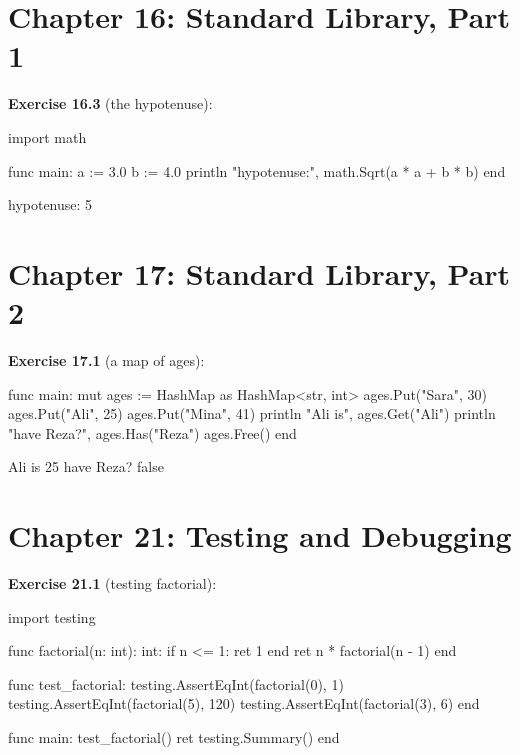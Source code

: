 \section*{Chapter 16: Standard Library, Part 1}

\textbf{Exercise 16.3} (the hypotenuse):

\begin{salamen}
import math

func main:
    a := 3.0
    b := 4.0
    println "hypotenuse:", math.Sqrt(a * a + b * b)
end
\end{salamen}

\begin{progout}
hypotenuse: 5
\end{progout}

\section*{Chapter 17: Standard Library, Part 2}

\textbf{Exercise 17.1} (a map of ages):

\begin{salamen}
func main:
    mut ages := HashMap {} as HashMap<str, int>
    ages.Put("Sara", 30)
    ages.Put("Ali", 25)
    ages.Put("Mina", 41)
    println "Ali is", ages.Get("Ali")
    println "have Reza?", ages.Has("Reza")
    ages.Free()
end
\end{salamen}

\begin{progout}
Ali is 25
have Reza? false
\end{progout}

\section*{Chapter 21: Testing and Debugging}

\textbf{Exercise 21.1} (testing factorial):

\begin{salamen}
import testing

func factorial(n: int): int:
    if n <= 1: ret 1 end
    ret n * factorial(n - 1)
end

func test_factorial:
    testing.AssertEqInt(factorial(0), 1)
    testing.AssertEqInt(factorial(5), 120)
    testing.AssertEqInt(factorial(3), 6)
end

func main:
    test_factorial()
    ret testing.Summary()
end
\end{salamen}

